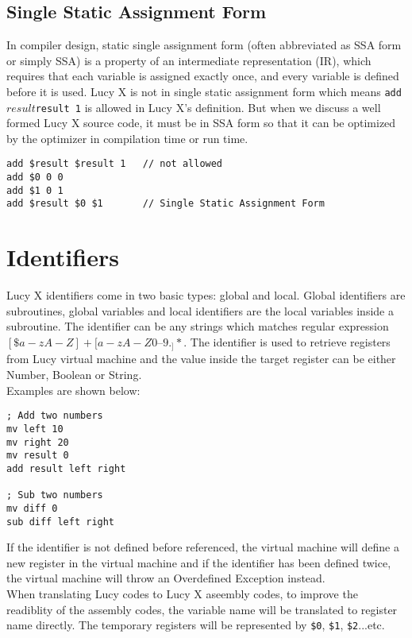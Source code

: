 \subsection{Single Static Assignment Form}
In compiler design, static single assignment form (often abbreviated as SSA form or simply SSA) is a property of an intermediate representation (IR), which requires that each variable is assigned exactly once, and every variable is defined before it is used. Lucy X is not in single static assignment form which means \texttt{add $result $result 1} is allowed in Lucy X's definition. But when we discuss a well formed Lucy X source code, it must be in SSA form so that it can be optimized by the optimizer in compilation time or run time.
\begin{lstlisting}[language=LucyX]
add $result $result 1   // not allowed
add $0 0 0
add $1 0 1
add $result $0 $1       // Single Static Assignment Form
\end{lstlisting}


\section{Identifiers}
Lucy X identifiers come in two basic types: global and local. Global identifiers are subroutines, global variables and local identifiers are the local variables inside a subroutine. The identifier can be any strings which matches regular expression $[\$a-zA-Z]+[a-zA-Z0–9._]*$. The identifier is used to retrieve registers from Lucy virtual machine and the value inside the target register can be either Number, Boolean or String. \\
Examples are shown below:
\begin{lstlisting}[language=LucyX]
; Add two numbers
mv left 10
mv right 20
mv result 0
add result left right

; Sub two numbers
mv diff 0
sub diff left right
\end{lstlisting}
If the identifier is not defined before referenced, the virtual machine will define a new register in the virtual machine and if the identifier has been defined twice, the virtual machine will throw an Overdefined Exception instead. \\
When translating Lucy codes to Lucy X aseembly codes, to improve the readiblity of the assembly codes, the variable name will be translated to register name directly. The temporary registers will be represented by \texttt{\$0}, \texttt{\$1}, \texttt{\$2}...etc.


